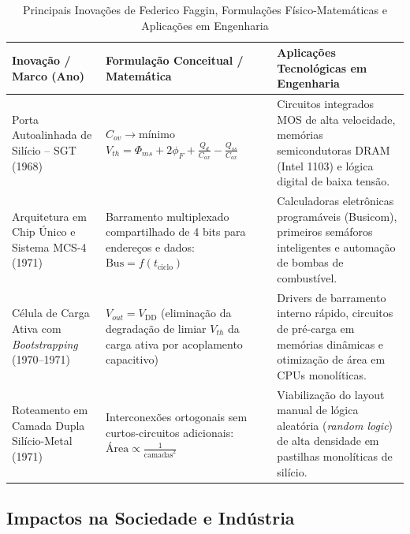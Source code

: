 \begin{table}[t]
\caption{Principais Inovações de Federico Faggin, Formulações Físico-Matemáticas e Aplicações em Engenharia}
\label{tab:inovacoes_faggin}
\centering
\begin{tabularx}{\textwidth}{p{3.8cm} p{5.5cm} X}
\toprule
\textbf{Inovação / Marco (Ano)} & \textbf{Formulação Conceitual / Matemática} & \textbf{Aplicações Tecnológicas em Engenharia} \\
\midrule
Porta Autoalinhada de Silício -- SGT (1968) & $C_{ov} \to \text{mínimo}$ \newline $V_{th} = \Phi_{ms} + 2\phi_F + \frac{Q_d}{C_{ox}} - \frac{Q_{ss}}{C_{ox}}$ & Circuitos integrados MOS de alta velocidade, memórias semicondutoras DRAM (Intel 1103) e lógica digital de baixa tensão. \\
Arquitetura em Chip Único e Sistema MCS-4 (1971) & Barramento multiplexado compartilhado de 4 bits para endereços e dados: $\text{Bus} = f(t_{\text{ciclo}})$ & Calculadoras eletrônicas programáveis (Busicom), primeiros semáforos inteligentes e automação de bombas de combustível. \\
Célula de Carga Ativa com \textit{Bootstrapping} (1970--1971) & $V_{out} = V_{\text{DD}}$ (eliminação da degradação de limiar $V_{th}$ da carga ativa por acoplamento capacitivo) & Drivers de barramento interno rápido, circuitos de pré-carga em memórias dinâmicas e otimização de área em CPUs monolíticas. \\
Roteamento em Camada Dupla Silício-Metal (1971) & Interconexões ortogonais sem curtos-circuitos adicionais: $\text{Área} \propto \frac{1}{\text{camadas}^2}$ & Viabilização do layout manual de lógica aleatória (\textit{random logic}) de alta densidade em pastilhas monolíticas de silício. \\
\bottomrule
\end{tabularx}
\end{table}

\subsection{Impactos na Sociedade e Indústria}
\label{subsec:impactos_sociedade}


